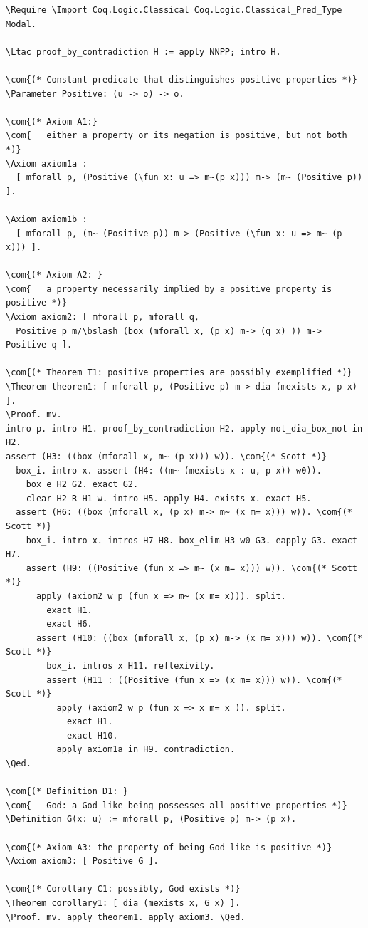 \documentclass{llncs}
\newcommand{\red}[1]{\textcolor[rgb]{1,0,0}{#1}}
\newcommand{\blue}[1]{\textcolor[rgb]{0,0,1}{#1}}
\newcommand{\brown}[1]{\textcolor[rgb]{0.8,0.6,0.4}{#1}}
\newcommand{\Parameter}{\red{Parameter}}
\newcommand{\Ltac}{\red{Ltac}}
\newcommand{\Axiom}{\red{Axiom}}
\newcommand{\Theorem}{\red{Theorem}}
\newcommand{\Definition}{\red{Definition}}
\newcommand{\Require}{\blue{Require}}
\newcommand{\Import}{\blue{Import}}
\newcommand{\fun}{\blue{fun}}
\newcommand{\Proof}{\blue{Proof}}
\newcommand{\Qed}{\blue{Qed}}
\newcommand{\com}[1]{\brown{#1}}
\newcommand{\bslash}{\symbol{92}}
\begin{document}
\begin{Verbatim}[commandchars=\\\{\},fontsize=\verbsize]
\Require \Import Coq.Logic.Classical Coq.Logic.Classical_Pred_Type Modal.

\Ltac proof_by_contradiction H := apply NNPP; intro H.

\com{(* Constant predicate that distinguishes positive properties *)}
\Parameter Positive: (u -> o) -> o.

\com{(* Axiom A1:} 
\com{   either a property or its negation is positive, but not both *)}
\Axiom axiom1a : 
  [ mforall p, (Positive (\fun x: u => m~(p x))) m-> (m~ (Positive p)) ].

\Axiom axiom1b : 
  [ mforall p, (m~ (Positive p)) m-> (Positive (\fun x: u => m~ (p x))) ].

\com{(* Axiom A2: }
\com{   a property necessarily implied by a positive property is positive *)}
\Axiom axiom2: [ mforall p, mforall q, 
  Positive p m/\bslash (box (mforall x, (p x) m-> (q x) )) m-> Positive q ].

\com{(* Theorem T1: positive properties are possibly exemplified *)}
\Theorem theorem1: [ mforall p, (Positive p) m-> dia (mexists x, p x) ].
\Proof. mv.
intro p. intro H1. proof_by_contradiction H2. apply not_dia_box_not in H2.
assert (H3: ((box (mforall x, m~ (p x))) w)). \com{(* Scott *)}
  box_i. intro x. assert (H4: ((m~ (mexists x : u, p x)) w0)).
    box_e H2 G2. exact G2.
    clear H2 R H1 w. intro H5. apply H4. exists x. exact H5.
  assert (H6: ((box (mforall x, (p x) m-> m~ (x m= x))) w)). \com{(* Scott *)}   
    box_i. intro x. intros H7 H8. box_elim H3 w0 G3. eapply G3. exact H7.
    assert (H9: ((Positive (fun x => m~ (x m= x))) w)). \com{(* Scott *)}
      apply (axiom2 w p (fun x => m~ (x m= x))). split.
        exact H1.
        exact H6.
      assert (H10: ((box (mforall x, (p x) m-> (x m= x))) w)). \com{(* Scott *)}
        box_i. intros x H11. reflexivity.
        assert (H11 : ((Positive (fun x => (x m= x))) w)). \com{(* Scott *)}
          apply (axiom2 w p (fun x => x m= x )). split.
            exact H1.
            exact H10.
          apply axiom1a in H9. contradiction.
\Qed.

\com{(* Definition D1: }
\com{   God: a God-like being possesses all positive properties *)}
\Definition G(x: u) := mforall p, (Positive p) m-> (p x).

\com{(* Axiom A3: the property of being God-like is positive *)}
\Axiom axiom3: [ Positive G ].

\com{(* Corollary C1: possibly, God exists *)}
\Theorem corollary1: [ dia (mexists x, G x) ]. 
\Proof. mv. apply theorem1. apply axiom3. \Qed.


\end{Verbatim}
\end{document}
